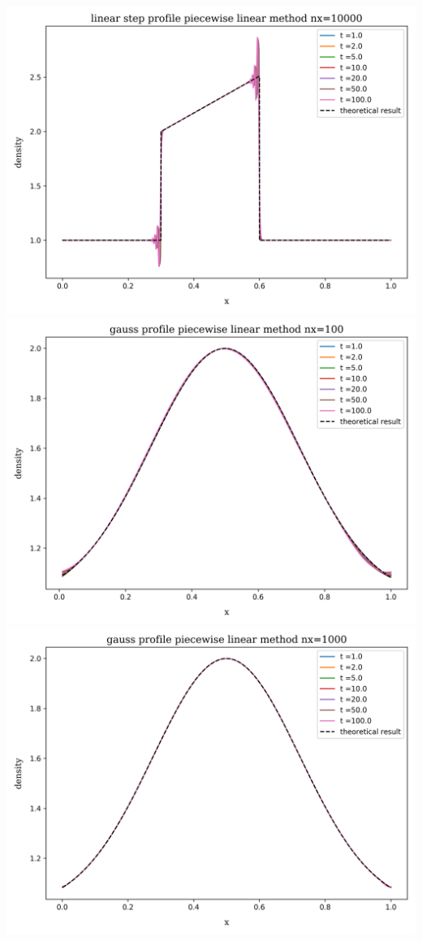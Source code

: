 \begin{frame}
\begin{columns}
			\includegraphics[height=.33\textheight]{../results/1D/pwlin/nx=10000/plot_advection_linear_step_pwlin_nx=10000.png}
			\centering
			\includegraphics[height=.33\textheight]{../results/1D/pwlin/nx=100/plot_advection_gauss_pwlin_nx=100.png}\\
			\includegraphics[height=.33\textheight]{../results/1D/pwlin/nx=1000/plot_advection_gauss_pwlin_nx=1000.png}\\

\end{columns}
\end{frame}

